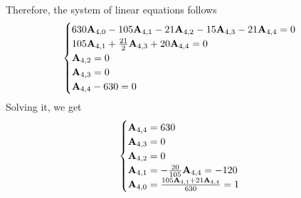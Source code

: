 \begin{examp}
\begin{equation*}
\begin{split}
        \end{split}
    \end{equation*}
    Therefore, the system of linear equations follows
    \begin{equation*}
        \begin{cases}
            630 {\mathbf{A}} \sb{4,0} - 105 {\mathbf{A}} \sb{4,1} - 21 {\mathbf{A}} \sb{4,2} - 15 {\mathbf{A}} \sb{4,3} - 21 {\mathbf{A}} \sb{4,4} = 0 \\
            105 {\mathbf{A}} \sb{4,1} + \frac{21}{2} {\mathbf{A}} \sb{4,3} + 20 {\mathbf{A}} \sb{4,4} = 0 \\
            {\mathbf{A}} \sb{4,2} = 0 \\
            {\mathbf{A}} \sb{4,3} = 0 \\
            {\mathbf{A}} \sb{4,4} - 630 = 0
        \end{cases}
    \end{equation*}
    Solving it, we get
    \begin{equation*}
        \begin{cases}
            {\mathbf{A}} \sb{4,4} = 630 \\
            {\mathbf{A}} \sb{4,3} = 0 \\
            {\mathbf{A}} \sb{4,2} = 0 \\
            {\mathbf{A}} \sb{4,1} = - \frac{20}{105} {\mathbf{A}} \sb{4,4} = -120 \\
            {\mathbf{A}} \sb{4,0} = \frac{105 {\mathbf{A}} \sb{4,1} + 21 {\mathbf{A}} \sb{4,4}}{630} = 1
        \end{cases}
    \end{equation*}
\end{examp}